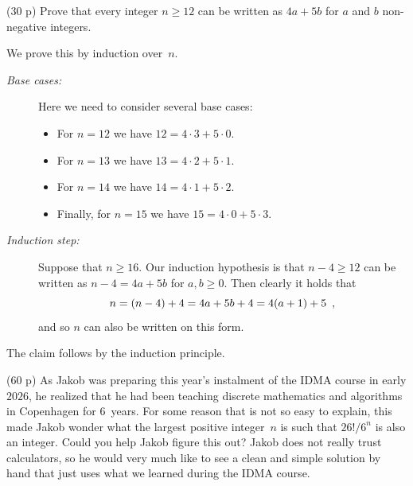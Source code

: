 \documentclass{jn-pset}
\begin{document}
\begin{problem}
\begin{subproblem}%
  {(30 p)}
  {\ignorespaces}
  Prove that every integer
  $n \geq 12$
  can be written as
  $4a + 5b$ for $a$ and $b$ non-negative integers.
\end{subproblem}

\begin{solution}
  We prove this by 
  induction over~$n$.
  \begin{description}
  \item[\emph{Base cases:}]
    Here we need to consider several base cases:
    \begin{itemize}
    \item
      For $n=12$ we have
      $12 = 4 \cdot 3 + 5 \cdot 0$.
      
    \item
      For $n=13$ we have
      $13 = 4 \cdot 2 + 5 \cdot 1$.
      
    \item
      For $n=14$ we have
      $14 = 4 \cdot 1 + 5 \cdot 2$.
      
    \item
      Finally, for $n=15$ we have
      $15 = 4 \cdot 0 + 5 \cdot 3$.
      
    \end{itemize}
    
  \item[\emph{Induction step:}]
    Suppose that $n \geq 16$. Our induction hypothesis is that $n-4 \geq 12$ can be written as
    $n-4 = 4a + 5b$ for $a,b \geq 0$. Then clearly it holds that
    \begin{equation}
      \label{eq:induction-step-problem-1b}
      n =
      (n-4) + 4 =
      4a + 5b + 4 =
      4(a+1) + 5
      \enspace ,
    \end{equation}
    and so $n$ can also be written on this form.
  \end{description}
  The claim follows by the induction principle.
\end{solution}


\end{problem}



\begin{problem}
  (60 p)
  As Jakob was preparing this year's instalment of the IDMA course in
  early $2026$, he realized that he had been teaching discrete
  mathematics and algorithms in Copenhagen for $6$~years.  For some
  reason that is not so easy to explain, this made Jakob wonder what the
  largest positive integer~$n$ is such that
  $26! / 6^n$
  is also an integer.
  Could you help Jakob figure this out?  Jakob does not
  really trust calculators, so he would very much like to see a clean and simple
  solution by hand that just uses what we learned during the IDMA course.
\end{problem}
\end{document}
